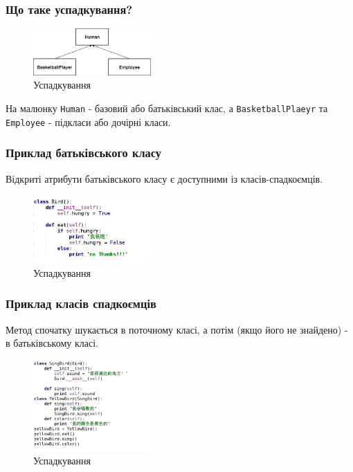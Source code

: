 \begin{frame}
\frametitle{Що таке успадкування?}
\begin{figure}
\begin{center}
 \includegraphics[width=0.4\textwidth]{pictures/inheritance.jpg}
\caption{Успадкування}
\label{inheritance} 
\end{center}
\end{figure}

На малюнку \texttt{Human} - базовий або батьківський клас, а \texttt{BasketballPlaeyr} та \texttt{Employee} - підкласи або дочірні класи.

\end{frame}

\begin{frame}
\frametitle{Приклад батьківського класу}
Відкриті атрибути батьківського класу є доступними із класів-спадкоємців.

\begin{figure}
\begin{center}
 \includegraphics[width=0.4\textwidth]{pictures/class-bird.png}
\caption{Успадкування}
\label{inheritance} 
\end{center}
\end{figure}

\end{frame}

\begin{frame}
\frametitle{Приклад класів спадкоємців}

Метод спочатку шукається в поточному класі, а потім (якщо його не знайдено) - в батьківському класі. 

\begin{figure}
\begin{center}
 \includegraphics[width=0.4\textwidth]{pictures/class-signbird.png}
\caption{Успадкування}
\label{inheritance} 
\end{center}
\end{figure}

\end{frame}

